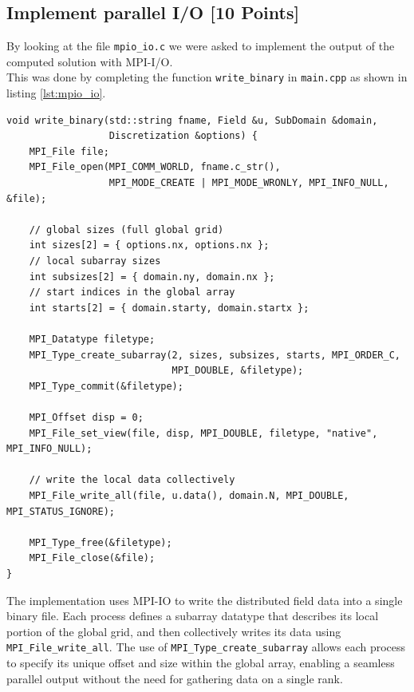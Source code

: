\documentclass[unicode,10pt,a4paper,oneside,numbers=endperiod,openany]{scrartcl}
\begin{document}
\subsection{Implement parallel I/O [10 Points]}
By looking at the file \texttt{mpio\_io.c} we were asked to implement the output of the computed solution with MPI-I/O.\\
This was done by completing the function \texttt{write\_binary} in \texttt{main.cpp} as shown in listing \ref{lst:mpio_io}.
\begin{lstlisting}[style=grayverbatim,label={lst:mpio_io},caption={MPI-IO implementation of the output}]
void write_binary(std::string fname, Field &u, SubDomain &domain,
                  Discretization &options) {
    MPI_File file;
    MPI_File_open(MPI_COMM_WORLD, fname.c_str(),
                  MPI_MODE_CREATE | MPI_MODE_WRONLY, MPI_INFO_NULL, &file);

    // global sizes (full global grid)
    int sizes[2] = { options.nx, options.nx };
    // local subarray sizes
    int subsizes[2] = { domain.ny, domain.nx };
    // start indices in the global array
    int starts[2] = { domain.starty, domain.startx };

    MPI_Datatype filetype;
    MPI_Type_create_subarray(2, sizes, subsizes, starts, MPI_ORDER_C,
                             MPI_DOUBLE, &filetype);
    MPI_Type_commit(&filetype);

    MPI_Offset disp = 0;
    MPI_File_set_view(file, disp, MPI_DOUBLE, filetype, "native", MPI_INFO_NULL);

    // write the local data collectively
    MPI_File_write_all(file, u.data(), domain.N, MPI_DOUBLE, MPI_STATUS_IGNORE);

    MPI_Type_free(&filetype);
    MPI_File_close(&file);
}
\end{lstlisting}
The implementation uses MPI-IO to write the distributed field data into a single binary file. Each process defines a subarray datatype that describes its local portion of the global grid, and then collectively writes its data using \texttt{MPI\_File\_write\_all}. The use of \texttt{MPI\_Type\_create\_subarray} allows each process to specify its unique offset and size within the global array, enabling a seamless parallel output without the need for gathering data on a single rank.
\end{document}
